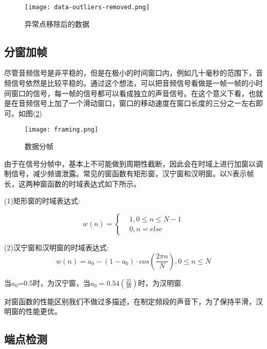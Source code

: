 \documentclass[winfonts]{njuthesis}
\begin{document}
			\begin{figure}[H]
				\centering
				\texttt{[image: data-outliers-removed.png]} 
				\caption{异常点移除后的数据}
				\label{fig: data-outliers-removed}
			\end{figure}
		
		\subsection{分窗加帧}
		
			尽管音频信号是非平稳的，但是在极小的时间窗口内，例如几十毫秒的范围下，音频信号依然是比较平稳的。通过这个想法，可以把音频信号看做是一帧一帧的小时间窗口的信号，每一帧的信号都可以看成独立的声音信号。在这个意义下看，也就是在音频信号上加了一个滑动窗口，窗口的移动速度在窗口长度的三分之一左右即可。如图(\ref{fig: framing})
					
			\begin{figure}[H]
				\centering
				\texttt{[image: framing.png]} 
				\caption{数据分帧}
				\label{fig: framing}
			\end{figure}
		
			由于在信号分帧中，基本上不可能做到周期性截断，因此会在时域上进行加窗以调制信号，减少频谱泄露。常见的窗函数有矩形窗，汉宁窗和汉明窗\cite{Window_function}。以N表示帧长，这两种窗函数的时域表达式如下所示。
			
			(1)矩形窗的时域表达式:
			
			\begin{equation}
				w(n)=\left\{
				\begin{aligned}
					&1, 0\leq n \leq N - 1\\
					&0, n = else
				\end{aligned}
				\right.
			\end{equation}
			
			
			(2)汉宁窗和汉明窗的时域表达式:
			\begin{equation}
				w(n)=a_0-(1-a_0)\cdot cos(\frac{2\pi n}{N}), 0 \leq n \leq N
			\end{equation}
			
			当$a_0$=0.5时，为汉宁窗，当$a_0=0.54(\frac{25}{46})$时，为汉明窗.
			
			对窗函数的性能区别我们不做过多描述，在制定频段的声音下，为了保持平滑，汉明窗的性能更优。
			
			
		\subsection{端点检测}
		
\end{document}
